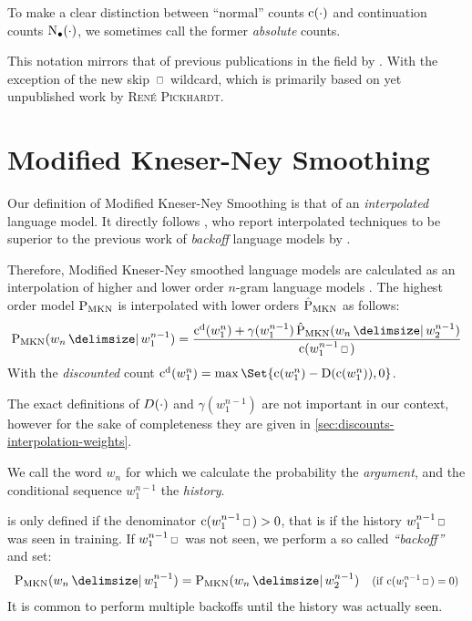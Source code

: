 To make a clear distinction between ``normal'' counts $\operatorname{c}(\cdot)$ and
continuation counts $\operatorname{N}_{\bullet}(\cdot)$, we
sometimes call the former \emph{absolute} counts.

This notation mirrors that of previous publications in the field by
\textcite{ChenGoodman1996,ChenGoodman1998,ChenGoodman1999,Goodman2001,Pickhardt2014}.
With the exception of the new skip $\Skp$ wildcard, which is primarily based
on yet unpublished work by \textsc{Ren{\'e} Pickhardt}.

\section{Modified Kneser-Ney Smoothing}
\label{sec:review-lm-mkn}

Our definition of Modified Kneser-Ney Smoothing is that of an
\emph{interpolated} language model.
It directly follows \textcite{ChenGoodman1999}, who report interpolated
techniques to be superior to the previous work of \emph{backoff} language
models by \textcite{KneserNey1995}.

Therefore, Modified Kneser-Ney smoothed language models are calculated as an
interpolation of higher and lower order $n$-gram language models
\parencite{Pickhardt2014}.
The highest order model $\ProbMKN$ is interpolated with lower orders $\ProbMKN*$
as follows:
\begin{equation}
  \label{eq:mkn-high}
  \ProbMKN{w_n}{w_1^{n-1}} =
    \frac{\DiscountedCount(w_1^n) + \gamma(w_1^{n-1}) \ProbMKN*{w_n}{w_2^{n-1}}}
         {\Count(w_1^{n-1} \Skp)} \\
\end{equation}
With the \emph{discounted} count
${\DiscountedCount(w_1^n) = \max\Set{\Count(w_1^n) - \Discount(\Count(w_1^n)), 0}}$.

The exact definitions of $D(\cdot)$ and $\gamma(w_1^{n-1})$ are not
important in our context, however for the sake of completeness they are given
in \cref{sec:discounts-interpolation-weights}.

We call the word $w_n$ for which we calculate the probability the
\emph{argument}, and the conditional sequence $w_1^{n-1}$ the \emph{history}.

 is only defined if the denominator
${\Count(w_1^{n-1} \Skp) > 0}$, that is if the history $w_1^{n-1} \Skp$ was seen
in training.
If $w_1^{n-1} \Skp$ was not seen, we perform a so called \emph{``backoff''}
and set:
\begin{align}
  \label{eq:mkn-backoff}
  \ProbMKN{w_n}{w_1^{n-1}} = \ProbMKN{w_n}{w_2^{n-1}}
      & & \Condition{\Count(w_1^{n-1} \Skp) = 0}
\end{align}
It is common to perform multiple backoffs until the history was actually seen.

